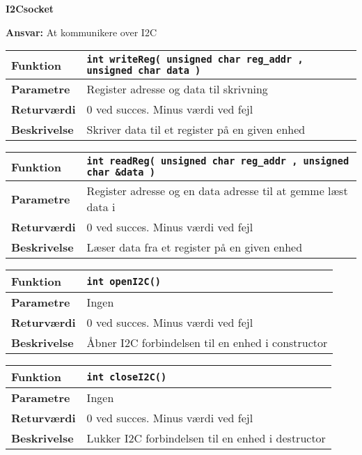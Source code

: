 {\centering
\textbf{I2Csocket}\par
}
\textbf{Ansvar:} At kommunikere over I2C \


\begin{center}
    \begin{tabular}{ | l | p{} |}
    \hline
    \textbf{Funktion}	& \verb+int writeReg( unsigned char reg_addr , unsigned char data ) +		\\ \hline
    \textbf{Parametre} 	& Register adresse og data til skrivning									\\ \hline
    \textbf{Returværdi}	& 0 ved succes. Minus værdi ved fejl										\\ \hline
    \textbf{Beskrivelse}	& Skriver data til et register på en given enhed							\\ \hline
    \end{tabular}
\end{center}

\begin{center}
    \begin{tabular}{ | l | p{} |}
    \hline
    \textbf{Funktion}	& \verb+int readReg( unsigned char reg_addr , unsigned char &data ) +		\\ \hline
    \textbf{Parametre} 	& Register adresse og en data adresse til at gemme læst data i			\\ \hline
    \textbf{Returværdi}	& 0 ved succes. Minus værdi ved fejl										\\ \hline
    \textbf{Beskrivelse}	& Læser data fra et register på en given enhed							\\ \hline
    \end{tabular}
\end{center}

\begin{center}
    \begin{tabular}{ | l | p{} |}
    \hline
    \textbf{Funktion}	& \verb+int openI2C() +													\\ \hline
    \textbf{Parametre} 	& Ingen																	\\ \hline
    \textbf{Returværdi}	& 0 ved succes. Minus værdi ved fejl										\\ \hline
    \textbf{Beskrivelse}	& Åbner I2C forbindelsen til en enhed i constructor						\\ \hline
    \end{tabular}
\end{center}

\begin{center}
    \begin{tabular}{ | l | p{} |}
    \hline
    \textbf{Funktion}	& \verb+int closeI2C() +													\\ \hline
    \textbf{Parametre} 	& Ingen																	\\ \hline
    \textbf{Returværdi}	& 0 ved succes. Minus værdi ved fejl										\\ \hline
    \textbf{Beskrivelse}	& Lukker I2C forbindelsen til en enhed i destructor						\\ \hline
    \end{tabular}
\end{center}



